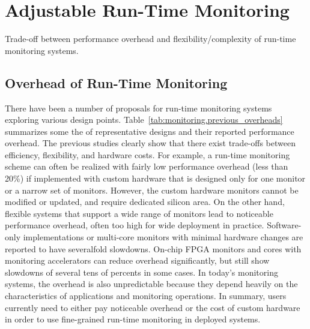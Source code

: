 \section{Adjustable Run-Time Monitoring}
\label{sec:monitoring}

\begin{table*}[t]
  \begin{center}
    \vspace{-0.0in}
    \begin{footnotesize}
    
    \end{footnotesize}
    \caption{Trade-off between performance overhead and flexibility/complexity of run-time monitoring systems.}
    \vspace{-0.2in}
    \label{tab:monitoring.previous_overheads}
  \end{center}
\end{table*}

\subsection{Overhead of Run-Time Monitoring}

There have been a number of proposals for run-time monitoring systems exploring various
design points. %
Table~\ref{tab:monitoring.previous_overheads} summarizes some the of representative designs
and their reported performance overhead. The previous studies clearly show that there
exist trade-offs between efficiency, flexibility, and hardware costs. 
For example, a run-time monitoring scheme can often be realized with fairly low
performance overhead (less than 20\%) if implemented with custom hardware that is
designed only for one monitor or a narrow set of monitors. However, the custom
hardware monitors cannot be modified or updated, and require dedicated silicon area. 
On the other hand, flexible systems that support a wide range of monitors lead 
to noticeable performance overhead, often too high for wide deployment in practice.
Software-only implementations \cite{nagarajan-interact08, lift-micro06,
purify-usenix92, taintcheck-ndsss05} or multi-core monitors with minimal
hardware changes \cite{lba-asid06} are reported to have severalfold slowdowns.
On-chip FPGA monitors \cite{flexcore-micro10} and cores with monitoring accelerators
\cite{lba-isca08, fade-hpca14} can reduce overhead significantly, but still show
slowdowns of several tens of percents in some cases.
In today's monitoring systems, the overhead is also unpredictable because they
depend heavily on the characteristics of applications and monitoring operations.
In summary, users currently need to either pay noticeable overhead or the cost of custom
hardware in order to use fine-grained run-time monitoring in deployed systems.

